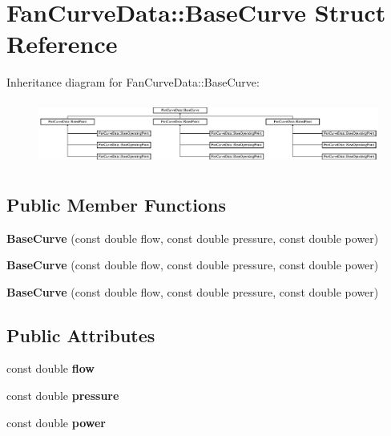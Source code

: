 \hypertarget{struct_fan_curve_data_1_1_base_curve}{}\section{Fan\+Curve\+Data\+:\+:Base\+Curve Struct Reference}
\label{struct_fan_curve_data_1_1_base_curve}
Inheritance diagram for Fan\+Curve\+Data\+:\+:Base\+Curve\+:\begin{figure}[H]
\begin{center}
\leavevmode
\includegraphics[height=2.111614cm]{da/d6e/struct_fan_curve_data_1_1_base_curve}
\end{center}
\end{figure}
\subsection*{Public Member Functions}
\begin{DoxyCompactItemize}
\item 
\mbox{\label{struct_fan_curve_data_1_1_base_curve_a05d0e881e03368efcbab71997ff25f33}} 
{\bfseries Base\+Curve} (const double flow, const double pressure, const double power)
\item 
\mbox{\label{struct_fan_curve_data_1_1_base_curve_a05d0e881e03368efcbab71997ff25f33}} 
{\bfseries Base\+Curve} (const double flow, const double pressure, const double power)
\item 
\mbox{\label{struct_fan_curve_data_1_1_base_curve_a05d0e881e03368efcbab71997ff25f33}} 
{\bfseries Base\+Curve} (const double flow, const double pressure, const double power)
\end{DoxyCompactItemize}
\subsection*{Public Attributes}
\begin{DoxyCompactItemize}
\item 
\mbox{\label{struct_fan_curve_data_1_1_base_curve_ab8b4cb389033aa5b58b49cebd8b672c6}} 
const double {\bfseries flow}
\item 
\mbox{\label{struct_fan_curve_data_1_1_base_curve_a100c4a42e149760c3f3722dce0b679a3}} 
const double {\bfseries pressure}
\item 
\mbox{\label{struct_fan_curve_data_1_1_base_curve_a4282ce2c8fa4150ecf011c9edaa7cb9d}} 
const double {\bfseries power}
\end{DoxyCompactItemize}
